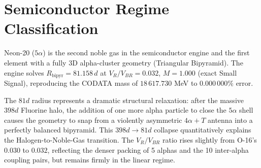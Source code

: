\section{Semiconductor Regime Classification}
Neon-20 ($5\alpha$) is the second noble gas in the semiconductor engine and the first element with a fully 3D alpha-cluster geometry (Triangular Bipyramid). The engine solves $R_{\text{bipyr}} = 81.158\,d$ at $V_R/V_{BR} = 0.032$, $M = 1.000$ (exact Small Signal), reproducing the CODATA mass of $18\,617.730$ MeV to $0.000\,000\%$ error.

The $81d$ radius represents a dramatic structural relaxation: after the massive $398d$ Fluorine halo, the addition of one more alpha particle to close the $5\alpha$ shell causes the geometry to snap from a violently asymmetric $4\alpha+T$ antenna into a perfectly balanced bipyramid. This $398d \to 81d$ collapse quantitatively explains the Halogen-to-Noble-Gas transition. The $V_R/V_{BR}$ ratio rises slightly from O-16's $0.030$ to $0.032$, reflecting the denser packing of 5 alphas and the 10 inter-alpha coupling pairs, but remains firmly in the linear regime.

